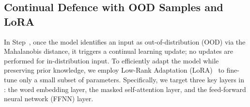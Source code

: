 \subsection{Continual Defence with OOD Samples and LoRA}
In Step~, once the model identifies an input as out-of-distribution (OOD) via the Mahalanobis distance, it triggers a continual learning update; no updates are performed for in-distribution input.
To efficiently adapt the model while preserving prior knowledge, we employ Low-Rank Adaptation (LoRA)~\cite{hu2022lora} to fine-tune only a small subset of parameters.
Specifically, we target three key layers in \ourapp: the word embedding layer, the masked self-attention layer, and the feed-forward neural network (FFNN) layer.
